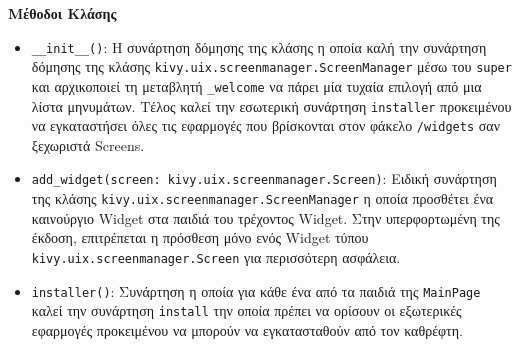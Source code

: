 \noindent\textbf{Μέθοδοι Κλάσης}
\begin{itemize}
    \item \texttt{\_\_init\_\_()}: Η συνάρτηση δόμησης της κλάσης η οποία καλή την συνάρτηση δόμησης της κλάσης \texttt{kivy.uix.screenmanager.ScreenManager} μέσω του \texttt{super} και αρχικοποιεί τη μεταβλητή \texttt{\_welcome} να πάρει μία τυχαία επιλογή από μια λίστα μηνυμάτων. Τέλος καλεί την εσωτερική συνάρτηση \texttt{installer} προκειμένου να εγκαταστήσει όλες τις εφαρμογές που βρίσκονται στον φάκελο \texttt{/widgets} σαν ξεχωριστά Screens.
    
    \item \texttt{add\_widget(screen: kivy.uix.screenmanager.Screen)}: Ειδική συνάρτηση της κλάσης \texttt{kivy.uix.screenmanager.ScreenManager} η οποία προσθέτει ένα καινούργιο Widget στα παιδιά του τρέχοντος Widget. Στην υπερφορτωμένη της έκδοση, επιτρέπεται η πρόσθεση μόνο ενός Widget τύπου \texttt{kivy.uix.screenmanager.Screen} για περισσότερη ασφάλεια.
    
    \item \texttt{installer()}: Συνάρτηση η οποία για κάθε ένα από τα παιδιά της \texttt{MainPage} καλεί την συνάρτηση \texttt{install} την οποία πρέπει να ορίσουν οι εξωτερικές εφαρμογές προκειμένου να μπορούν να εγκατασταθούν από τον καθρέφτη.
\end{itemize}

